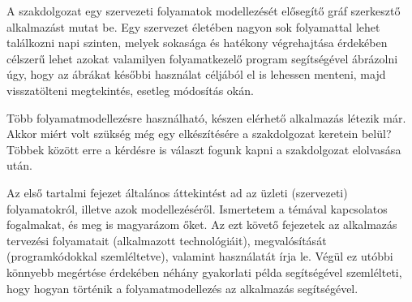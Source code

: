
A szakdolgozat egy szervezeti folyamatok modellezését elősegítő gráf szerkesztő alkalmazást mutat be. Egy szervezet életében nagyon sok folyamattal lehet találkozni napi szinten, melyek sokasága és hatékony végrehajtása érdekében célszerű lehet azokat valamilyen folyamatkezelő program segítségével ábrázolni úgy, hogy az ábrákat későbbi használat céljából el is lehessen menteni, majd visszatölteni megtekintés, esetleg módosítás okán.

Több folyamatmodellezésre használható, készen elérhető alkalmazás létezik már. Akkor miért volt szükség még egy elkészítésére a szakdolgozat keretein belül? Többek között erre a kérdésre is választ fogunk kapni a szakdolgozat elolvasása után.

Az első tartalmi fejezet általános áttekintést ad az üzleti (szervezeti) folyamatokról, illetve azok modellezéséről. Ismertetem a témával kapcsolatos fogalmakat, és meg is magyarázom őket. Az ezt követő fejezetek az alkalmazás tervezési folyamatait (alkalmazott technológiáit), megvalósítását (programkódokkal szemléltetve), valamint használatát írja le. Végül ez utóbbi könnyebb megértése érdekében néhány gyakorlati példa segítségével szemlélteti, hogy hogyan történik a folyamatmodellezés az alkalmazás segítségével.
